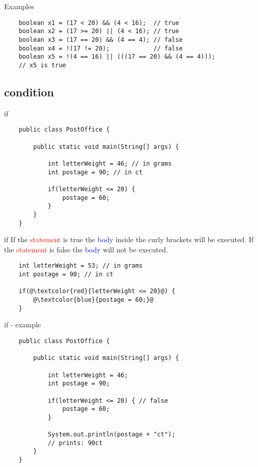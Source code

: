 \begin{frame}[fragile]{Examples}
	\begin{lstlisting}
	boolean x1 = (17 < 20) && (4 < 16);  // true
	boolean x2 = (17 >= 20) || (4 < 16); // true
	boolean x3 = (17 == 20) && (4 == 4); // false
	boolean x4 = !(17 != 20);            // false
	boolean x5 = !(4 == 16) || (((17 == 20) && (4 == 4))); 
	// x5 is true
	\end{lstlisting}
\end{frame}

\subsection{condition}
\begin{frame}[fragile]{if}
	\begin{lstlisting}
	public class PostOffice {
	
	    public static void main(String[] args) {
	
	        int letterWeight = 46; // in grams
	        int postage = 90; // in ct
	    
	        if(letterWeight <= 20) {
	            postage = 60;
	        }
	    }
	}
	\end{lstlisting}
\end{frame}

\begin{frame}[fragile]{if}
	If the \textcolor{red}{statement} is true the \textcolor{blue}{body} inside the curly brackets will be executed.
	If the \textcolor{red}{statement} is false the \textcolor{blue}{body} will not be executed.
	\begin{lstlisting}
	int letterWeight = 53; // in grams
	int postage = 90; // in ct
	    
	if(@\textcolor{red}{letterWeight <= 20}@) {
	    @\textcolor{blue}{postage = 60;}@
	}
	\end{lstlisting}
\end{frame}

\begin{frame}[fragile]{if - example}
	\begin{lstlisting}
	public class PostOffice {
	
	    public static void main(String[] args) {
	
	        int letterWeight = 46;
	        int postage = 90;
	        
	        if(letterWeight <= 20) { // false
	            postage = 60;
	        }
	        
	        System.out.println(postage + "ct");
	        // prints: 90ct
	    }
	}
	\end{lstlisting}
\end{frame}

